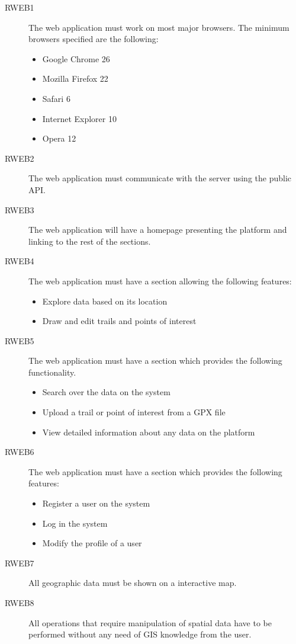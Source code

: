 \begin{description}
\item[RWEB1] The web application must work on most major browsers. The minimum browsers specified are the following:
  \begin{itemize}
  \item Google Chrome 26
  \item Mozilla Firefox 22
  \item Safari 6
  \item Internet Explorer 10
  \item Opera 12
  \end{itemize}
\item[RWEB2] The web application must communicate with the server using the public API.
\item[RWEB3] The web application will have a homepage presenting the platform and linking to the rest of the sections.
\item[RWEB4] The web application must have a section allowing the following features:
  \begin{itemize}
  \item Explore data based on its location
  \item Draw and edit trails and points of interest
  \end{itemize}
\item[RWEB5] The web application must have a section which provides the following functionality.
  \begin{itemize}
  \item Search over the data on the system
  \item Upload a trail or point of interest from a GPX file
  \item View detailed information about any data on the platform
  \end{itemize}
\item[RWEB6] The web application must have a section which provides the following features:
  \begin{itemize}
  \item Register a user on the system
  \item Log in the system
  \item Modify the profile of a user
  \end{itemize}
\item[RWEB7] All geographic data must be shown on a interactive map.
\item[RWEB8] All operations that require manipulation of spatial data have to be performed without any need of GIS knowledge from the user.

\end{description}
